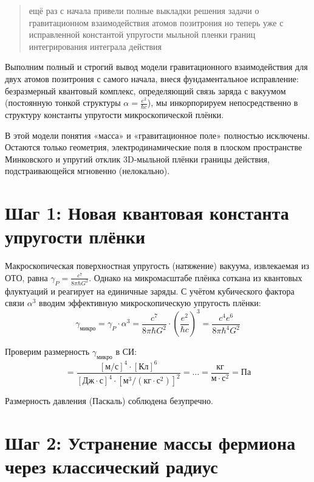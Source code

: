 \documentclass[12pt,a4paper]{article}
\begin{document}
\begin{quote}
ещё раз с начала привели полные выкладки решения задачи о гравитационном взаимодействия атомов позитрония но теперь уже с исправленной константой упругости мыльной пленки границ интегрирования интеграла действия
\end{quote}

Выполним полный и строгий вывод модели гравитационного взаимодействия для двух атомов позитрония с самого начала, внеся фундаментальное исправление: безразмерный квантовый комплекс, определяющий связь заряда с вакуумом (постоянную тонкой структуры $\alpha = \frac{e^2}{\hbar c}$), мы инкорпорируем непосредственно в структуру константы упругости микроскопической плёнки.

В этой модели понятия «масса» и «гравитационное поле» полностью исключены. Остаются только геометрия, электродинамические поля в плоском пространстве Минковского и упругий отклик 3D-мыльной плёнки границы действия, подстраивающейся мгновенно (нелокально).

\section*{Шаг 1: Новая квантовая константа упругости плёнки}

Макроскопическая поверхностная упругость (натяжение) вакуума, извлекаемая из ОТО, равна $\gamma_P = \frac{c^7}{8\pi \hbar G^2}$. Однако на микромасштабе плёнка соткана из квантовых флуктуаций и реагирует на единичные заряды. С учётом кубического фактора связи $\alpha^3$ вводим эффективную микроскопическую упругость плёнки:
\begin{equation}
\gamma_{микро} = \gamma_P \cdot \alpha^3 = \frac{c^7}{8\pi \hbar G^2} \cdot \left(\frac{e^2}{\hbar c}\right)^3 = \frac{c^4 e^6}{8\pi \hbar^4 G^2}
\end{equation}

Проверим размерность $\gamma_{микро}$ в СИ:
\begin{equation}
[\gamma_{микро}] = \frac{[\text{м}/\text{с}]^4 \cdot [\text{Кл}]^6}{[\text{Дж}\cdot\text{с}]^4 \cdot [\text{м}^3/(\text{кг}\cdot\text{с}^2)]^2} = \dots = \frac{\text{кг}}{\text{м} \cdot \text{с}^2} = \text{Па}
\end{equation}

Размерность давления (Паскаль) соблюдена безупречно.

\section*{Шаг 2: Устранение массы фермиона через классический радиус}
\end{document}
